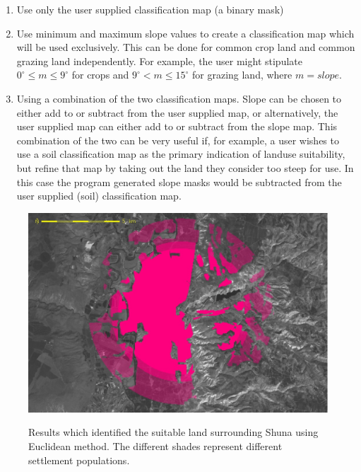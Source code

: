 \begin{enumerate} 

\item  Use only the user supplied classification map (a binary mask) 

\item  Use minimum and maximum slope values to create a classification map
which will be used exclusively.  This can be done for common crop land and
common grazing land independently.  For example, the user might stipulate
$0^\circ \leq m \leq 9^\circ$ for crops and $9^\circ < m \leq 15^\circ$ for
grazing land, where $m=slope$.  

\item  Using a combination of the two classification maps.  Slope can be chosen
to either add to or subtract from the user supplied map, or alternatively, the
user supplied map can either add to or subtract from the slope map.  This
combination of the two can be very useful if, for example, a user wishes to use
a soil classification map as the primary indication of landuse suitability, but
refine that map by taking out the land they consider too steep for use.  In
this case the program generated slope masks would be subtracted from the user
supplied (soil) classification map.  

\end{enumerate}

  \begin{figure}[htbp] %
  \includegraphics[scale=0.225]{./images/landcatchment.jpg}
   \label{fig:landCatchment} \caption{Results which identified the suitable
         land surrounding Shuna using Euclidean method.
   The different shades represent different settlement populations.}
   \end{figure}

